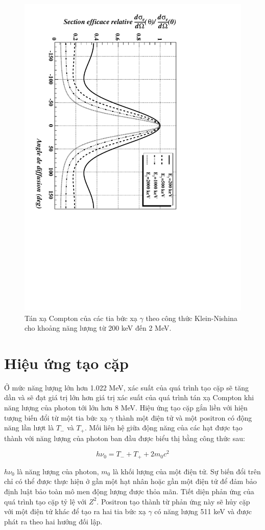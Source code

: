 \begin{figure}[!h]
\centering
\includegraphics[height=0.8\textwidth,angle = 90.0 ]{figure/fig_cosolythuyet/klein.pdf}
\caption{Tán xạ Compton của các tia bức xạ $\gamma$ theo công thức Klein-Nishina cho khoảng năng lượng từ 200 keV đến 2 MeV.}
\label{fig:klein}
\end{figure}

\section{Hiệu ứng tạo cặp}

Ở mức năng lượng lớn hơn 1.022 MeV, xác suất của quá trình tạo cặp sẽ tăng dần và sẽ đạt giá trị lớn hơn giá trị xác suất của quá trình tán xạ Compton khi năng lượng của photon tới lớn hơn 8 MeV. Hiệu ứng tạo cặp gắn liền với hiện tượng biến đổi từ một tia bức xạ $\gamma$ thành một 		điện tử và một positron có động năng lần lượt là $T_{-}$ và $T_{+}$. Mối liên hệ giữa động năng của các hạt được tạo thành với năng lượng của photon ban đầu được biểu thị bằng công thức sau:

\begin{equation}
	h\nu_{0} = T_{-} + T_{+} + 2m_{0}c^{2}
\end{equation}

$h\nu_{0}$ là năng lượng của photon, $m_{0}$ là khối lượng của một điện tử. Sự biến đổi trên chỉ có thể được thực hiện ở gần một hạt nhân hoặc gần một điện tử để đảm bảo định luật bảo toàn mô men động lượng được thỏa mãn. Tiết diện phản ứng của quá trình tạo cặp tỷ lệ với $Z^{2}$. Positron tạo thành từ phản ứng này sẽ hủy cặp với một điện tử khác để tạo ra hai tia bức xạ $\gamma$ có năng lượng 511 keV và được phát ra theo hai hướng đối lập.